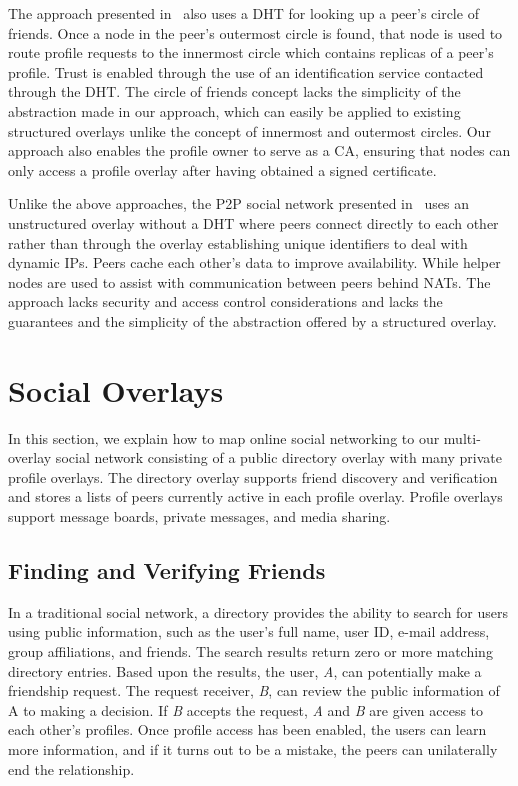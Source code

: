 The approach presented in~\cite{matryoshka} also uses a DHT for looking up a peer's
 circle of friends.  Once a node in the peer's
outermost circle is found, that node is used to route profile requests to the
innermost circle which contains replicas of a peer's profile. Trust is enabled
through the use of an identification service contacted through the DHT.  The
circle of friends concept lacks the simplicity of the abstraction made in our
approach, which can easily be applied to existing structured overlays
unlike the concept of innermost and outermost circles.  Our approach
also enables the profile owner to serve as a CA, ensuring that nodes can only
access a profile overlay after having obtained a signed certificate.  

Unlike the above approaches, the P2P social network presented in~\cite{tribler-osn}
uses an unstructured overlay without a DHT where peers connect directly to
each other rather than through the overlay establishing unique identifiers to
deal with dynamic IPs.  Peers cache each other's data to improve availability.
While helper nodes are used to assist with communication between peers behind
NATs.  The approach lacks security and access control considerations and lacks the
guarantees and the simplicity of the abstraction offered by a structured overlay.

\section{Social Overlays}
\label{social_overlays}
In this section, we explain how to map online social networking to our
multi-overlay social network consisting of a public directory overlay with many
private profile overlays.  The directory overlay supports friend discovery and
verification and stores a lists of peers currently active in each profile
overlay.  Profile overlays support message boards, private messages, and media
sharing.

\subsection{Finding and Verifying Friends}
In a traditional social network, a directory provides the ability to search
for users using public information, such as the user's full name, user ID,
e-mail address, group affiliations, and friends.  The search results return zero
or more matching directory entries.  Based upon the results, the user,
\textit{A}, can potentially make a friendship request.  The request receiver,
\textit{B}, can review the public information of A to making a decision.  If
\textit{B} accepts the request, \textit{A} and \textit{B} are given access to
each other's profiles.  Once profile access has been enabled, the users can
learn more information, and if it turns out to be a mistake, the peers can
unilaterally end the relationship.


